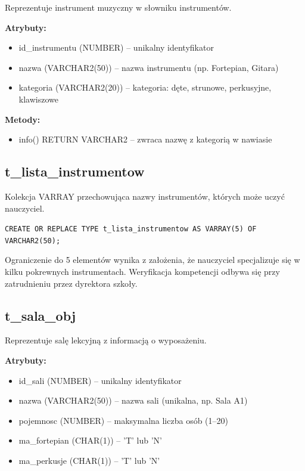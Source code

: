 \documentclass[12pt,a4paper]{article}
\begin{document}
Reprezentuje instrument muzyczny w słowniku instrumentów.

\textbf{Atrybuty:}
\begin{itemize}[nosep]
    \item id\_instrumentu (NUMBER) -- unikalny identyfikator
    \item nazwa (VARCHAR2(50)) -- nazwa instrumentu (np. Fortepian, Gitara)
    \item kategoria (VARCHAR2(20)) -- kategoria: dęte, strunowe, perkusyjne, klawiszowe
\end{itemize}

\textbf{Metody:}
\begin{itemize}[nosep]
    \item info() RETURN VARCHAR2 -- zwraca nazwę z kategorią w nawiasie
\end{itemize}

\subsection{t\_lista\_instrumentow}

Kolekcja VARRAY przechowująca nazwy instrumentów, których może uczyć nauczyciel.

\texttt{CREATE OR REPLACE TYPE t\_lista\_instrumentow AS VARRAY(5) OF VARCHAR2(50);}

Ograniczenie do 5 elementów wynika z założenia, że nauczyciel specjalizuje się w kilku pokrewnych instrumentach. Weryfikacja kompetencji odbywa się przy zatrudnieniu przez dyrektora szkoły.

\subsection{t\_sala\_obj}

Reprezentuje salę lekcyjną z informacją o wyposażeniu.

\textbf{Atrybuty:}
\begin{itemize}[nosep]
    \item id\_sali (NUMBER) -- unikalny identyfikator
    \item nazwa (VARCHAR2(50)) -- nazwa sali (unikalna, np. Sala A1)
    \item pojemnosc (NUMBER) -- maksymalna liczba osób (1--20)
    \item ma\_fortepian (CHAR(1)) -- 'T' lub 'N'
    \item ma\_perkusje (CHAR(1)) -- 'T' lub 'N'
\end{itemize}
\end{document}
